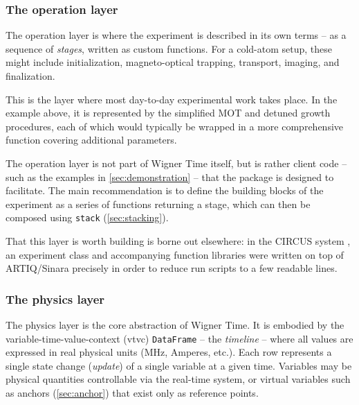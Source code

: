 \documentclass{SciPost}
\newcommand{\python}[1]{%
  \texttt{#1}%
}
\begin{document}
 
\subsubsection{The operation layer}
\label{sec:operationlayer}
The operation layer is where the experiment is described in its own terms – as a sequence of \emph{stages}, written as custom functions. For a cold-atom setup, these might include initialization, magneto-optical trapping, transport, imaging, and finalization.

This is the layer where most day-to-day experimental work takes place. In the example above, it is represented by the simplified MOT and detuned growth procedures, each of which would typically be wrapped in a more comprehensive function covering additional parameters.
 
The operation layer is not part of Wigner Time itself, but is rather client code – such as the examples in \cref{sec:demonstration} – that the package is designed to facilitate. The main recommendation is to define the building blocks of the experiment as a series of functions returning a stage, which can then be composed using \python{stack} (\cref{sec:stacking}).

That this layer is worth building is borne out elsewhere: in the CIRCUS system \cite{volponi2024circus}, an experiment class and accompanying function libraries were written on top of ARTIQ/Sinara precisely in order to reduce run scripts to a few readable lines.

\subsubsection{The physics layer}
\label{sec:physicslayer}
The physics layer is the core abstraction of Wigner Time. It is embodied by the variable-time-value-context (vtvc) \python{DataFrame} – the \emph{timeline} – where all values are expressed in real physical units (MHz, Amperes, etc.). Each row represents a single state change (\emph{update}) of a single variable at a given time. Variables may be physical quantities controllable via the real-time system, or virtual variables such as anchors (\cref{sec:anchor}) that exist only as reference points.
 
\end{document}

